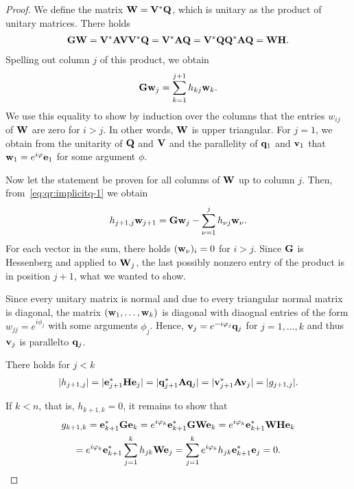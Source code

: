 \begin{proof}
  We define the matrix $\mathbf W = \mathbf V^*\mathbf Q$, which is unitary as the product of unitary matrices. There holds
  \begin{gather}
    \mathbf G\mathbf W = \mathbf V^*\mathbf A\mathbf V\mathbf V^*\mathbf Q = \mathbf V^*\mathbf A\mathbf Q
    = \mathbf V^*\mathbf Q\mathbf Q^*\mathbf A\mathbf Q = \mathbf W\mathbf H.
  \end{gather}
  Spelling out column $j$ of this product, we obtain
  \begin{gather}
    \label{eq:qr:implicitq-1}
    \mathbf G\mathbf w_j = \sum_{k=1}^{j+1} h_{kj} \mathbf w_{k}.
  \end{gather}
  We use this equality to show by induction over the columns that the
  entries $w_{ij}$ of $\mathbf W$ are zero for $i>j$. In other words,
  $\mathbf W$ is upper triangular.  For $j=1$, we obtain from the
  unitarity of $\mathbf Q$ and $\mathbf V$ and the parallelity of $\mathbf q_1$
  and $\mathbf v_1$ that $\mathbf w_1 = e^{i\varphi} \mathbf e_1$ for some argument $\phi$.

  Now let the statement be proven for all columns of $\mathbf W$ up to
  column $j$. Then, from~\eqref{eq:qr:implicitq-1} we obtain
  \begin{gather}
    h_{j+1,j}\mathbf w_{j+1} = \mathbf G\mathbf w_j - \sum_{\nu=1}^j h_{\nu j} \mathbf w_{\nu}.
  \end{gather}
  For each vector in the sum, there holds $(\mathbf w_{\nu})_i = 0$ for
  $i>j$. Since $\mathbf G$ is Hessenberg and applied to $\mathbf W_j$, the
  last possibly nonzero entry of the product is in position $j+1$,
  what we wanted to show.

  Since every unitary matrix is normal and due to
   every triangular
  normal matrix is diagonal, the matrix $(\mathbf w_1,\dots,\mathbf w_k)$ is
  diagonal with diaognal entries of the form $w_{jj} = e^{i\phi_j}$
  with some arguments $\phi_j$. Hence, $\mathbf v_j = e^{-i\varphi_j} \mathbf q_j$
  for $j=1,\dots,k$ and thus $\mathbf v_j$ is parallelto $\mathbf q_j$.

  There holds for $j<k$
  \begin{gather}
    \lvert h_{j+1,j}\rvert = \lvert\mathbf e_{j+1}^*\mathbf H\mathbf e_j\rvert = \lvert\mathbf q_{j+1}^*\mathbf A\mathbf q_j\rvert
    = \lvert\mathbf v_{j+1}^*\mathbf A\mathbf v_j\rvert = \lvert g_{j+1,j}\rvert.
  \end{gather}

  If $k<n$, that is, $h_{k+1,k}=0$, it remains to show that
  \begin{multline}
    g_{k+1,k} = \mathbf e_{k+1}^*\mathbf G\mathbf e_k = e^{i\varphi_k}\mathbf e_{k+1}^*\mathbf G\mathbf W\mathbf e_k
    =  e^{i\varphi_k}\mathbf e_{k+1}^*\mathbf W\mathbf H\mathbf e_k\\
    =  e^{i\varphi_k}\mathbf e_{k+1}^* \sum_{j=1}^k h_{jk} \mathbf W\mathbf e_j
    =  \sum_{j=1}^k e^{i\varphi_k} h_{jk} \mathbf e_{k+1}^* \mathbf e_j = 0.
  \end{multline}
\end{proof}

